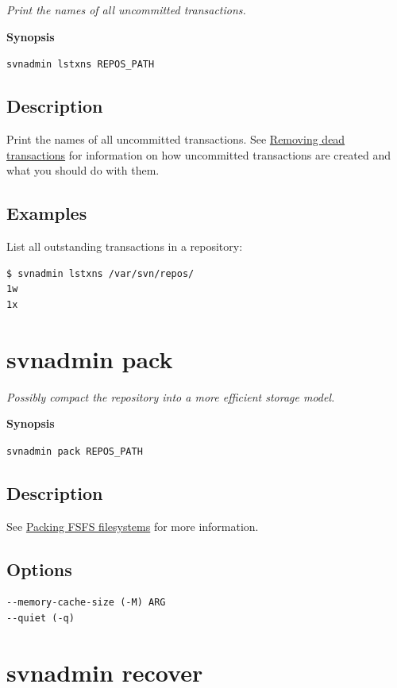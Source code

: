 \emph{Print the names of all uncommitted transactions.}

\textbf{Synopsis}

\texttt{svnadmin\ lstxns\ REPOS\_PATH}

\subsection{Description}

Print the names of all uncommitted transactions. See
\hyperref[svn.reposadmin.maint.diskspace.deadtxns]{Removing dead
transactions} for information on how uncommitted transactions are
created and what you should do with them.

\subsection{Examples}

List all outstanding transactions in a repository:

\begin{verbatim}
$ svnadmin lstxns /var/svn/repos/ 
1w
1x
\end{verbatim}

\section{svnadmin pack}\label{svn.ref.svnadmin.c.pack}

\emph{Possibly compact the repository into a more efficient storage
model.}

\textbf{Synopsis}

\texttt{svnadmin\ pack\ REPOS\_PATH}

\subsection{Description}

See \hyperref[svn.reposadmin.maint.diskspace.fsfspacking]{Packing FSFS
filesystems} for more information.

\subsection{Options}

\begin{verbatim}
--memory-cache-size (-M) ARG
--quiet (-q)
\end{verbatim}

\section{svnadmin recover}\label{svn.ref.svnadmin.c.recover}

